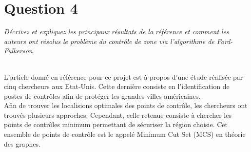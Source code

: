 \section{Question 4}
\textit{Décrivez et expliquez les principaux résultats de la référence \cite{tiquette} et comment les auteurs ont résolus le problème du contrôle de zone via l'algorithme de Ford-Fulkerson.}\\~\\\par
L'article donné en référence pour ce projet est à propos d'une étude réalisée par cinq chercheurs aux Etat-Unis. Cette dernière consiste en l'identification de postes de contrôles afin de protéger les grandes villes américaines.\\
Afin de trouver les localisions optimales des points de contrôle, les chercheurs ont trouvés plusieurs approches. Cependant, celle retenue consiste à chercher les points de contrôles minimum permettant de sécuriser la région choisie. Cet ensemble de points de contrôle est le appelé Minimum Cut Set (MCS) en théorie des graphes.
